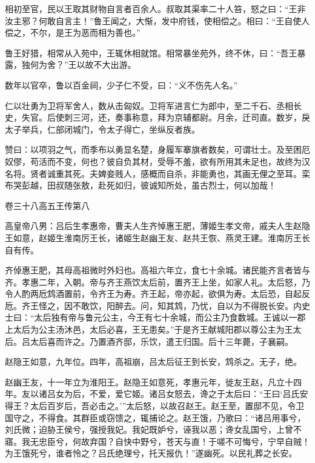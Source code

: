 \documentclass[12pt,UTF8]{ctexbook}
\begin{document}
相初至官，民以王取其财物自言者百余人。叔取其渠率二十人笞，怒之曰：“王非汝主邪？何敢自言主！”鲁王闻之，大惭，发中府钱，使相偿之。相曰：“王自使人偿之，不尔，是王为恶而相为善也。”



鲁王好猎，相常从入苑中，王辄休相就馆。相常暴坐苑外，终不休，曰：“吾王暴露，独何为舍？”王以故不大出游。



数年以官卒，鲁以百金祠，少子仁不受，曰：“义不伤先人名。”



仁以壮勇为卫将军舍人，数从击匈奴。卫将军进言仁为郎中，至二千石、丞相长史，失官。后使刺三河，还，奏事称意，拜为京辅都尉。月余，迁司直。数岁，戾太子举兵，仁部闭城门，令太子得亡，坐纵反者族。



赞曰：以项羽之气，而季布以勇显名楚，身履军搴旗者数矣，可谓壮士。及至困厄奴僇，苟活而不变，何也？彼自负其材，受辱不羞，欲有所用其未足也，故终为汉名将。贤者诚重其死。夫婢妾贱人，感概而自杀，非能勇也，其画无俚之至耳。栾布哭彭越，田叔随张敖，赴死如归，彼诚知所处，虽古烈士，何以加哉！





卷三十八高五王传第八



高皇帝八男：吕后生孝惠帝，曹夫人生齐悼惠王肥，薄姬生孝文帝，戚夫人生赵隐王如意，赵姬生淮南厉王长，诸姬生赵幽王友、赵共王恢、燕灵王建。淮南厉王长自有传。



齐倬惠王肥，其母高祖微时外妇也。高祖六年立，食七十余城。诸民能齐言者皆与齐。孝惠二年，入朝。帝与齐王燕饮太后前，置齐王上坐，如家人礼。太后怒，乃令人酌两卮鸩酒置前，令齐王为寿。齐王起，帝亦起，欲俱为寿。太后恐，自起反卮。齐王怪之，因不敢饮，阳醉去。问，知其鸩，乃忧，自以为不得脱长安。内史士曰：“太后独有帝与鲁元公主，今王有七十余城，而公主乃食数城。王诚以一郡上太后为公主汤沐邑，太后必喜，王无患矣。”于是齐王献城阳郡以尊公主为王太后。吕太后喜而许之。乃置酒齐邸，乐饮，遣王归国。后十三年薨，子襄嗣。



赵隐王如意，九年位。四年，高祖崩，吕太后征王到长安，鸩杀之。无子，绝。



赵幽王友，十一年立为淮阳王。赵隐王如意死，孝惠元年，徙友王赵，凡立十四年。友以诸吕女为后，不爱，爱它姬。诸吕女怒去，谗之于太后曰：“王曰‘吕氏安得王？太后百岁后，吾必击之。’”太后怒，以故召赵王。赵王至，置邸不见，令卫国守之，不得食。其群臣或窃馈之，辄捕论之。赵王饿，乃歌曰：“诸吕用事兮，刘氏微；迫胁王侯兮，强授我妃。我妃既妒兮，诬我以恶；谗女乱国兮，上曾不寤。我无忠臣兮，何故弃国？自快中野兮，苍天与直！于嗟不可悔兮，宁早自贼！为王饿死兮，谁者怜之？吕氏绝理兮，托天报仇！”遂幽死。以民礼葬之长安。
\end{document}
